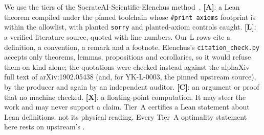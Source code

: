 \documentclass[11pt]{article}
\theoremstyle{remark}
\newcommand{\tier}[1]{\textbf{[#1]}}
\begin{document}
We use the tiers of the SocrateAI-Scientific-Elenchus method~\cite{elenchus}. \tier{A}: a Lean theorem compiled under
the pinned toolchain whose \verb|#print axioms| footprint is within the allowlist, with planted \texttt{sorry} and
planted-axiom controls caught. \tier{L}: a verified literature source, quoted with line numbers. Our L rows cite a
definition, a convention, a remark and a footnote. Elenchus's \texttt{citation\_check.py} accepts only theorems,
lemmas, propositions and corollaries, so it would refuse them on kind alone; the quotations were checked instead
against the alphaXiv full text of arXiv:1902.05438 (and, for YK-L-0003, the pinned upstream source), by the producer
and again by an independent auditor. \tier{C}: an
argument or proof that no machine checked. \tier{X}: a floating-point computation. It may steer the work and may
never support a claim. Tier~A certifies a Lean statement about Lean definitions, not its physical reading. Every
Tier~A optimality statement here rests on upstream's .
\end{document}
